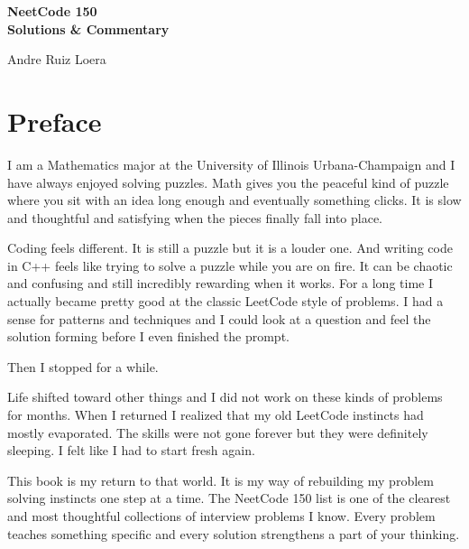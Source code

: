 \documentclass[12pt,letterpaper]{book}
\theoremstyle{definition}
\theoremstyle{remark}
\begin{document}
\begin{titlepage}
\begin{center}

\vspace*{4cm}

{\Huge\bfseries NeetCode 150}\\[1cm]

{\Large\bfseries Solutions \& Commentary}

\vfill

{\LARGE Andre Ruiz Loera}

\vspace{3cm}

\end{center}
\end{titlepage}

\chapter*{Preface}

I am a Mathematics major at the University of Illinois Urbana-Champaign and I have always enjoyed solving puzzles. Math gives you the peaceful kind of puzzle where you sit with an idea long enough and eventually something clicks. It is slow and thoughtful and satisfying when the pieces finally fall into place.

Coding feels different. It is still a puzzle but it is a louder one. And writing code in C++ feels like trying to solve a puzzle while you are on fire. It can be chaotic and confusing and still incredibly rewarding when it works. For a long time I actually became pretty good at the classic LeetCode style of problems. I had a sense for patterns and techniques and I could look at a question and feel the solution forming before I even finished the prompt.

Then I stopped for a while.

Life shifted toward other things and I did not work on these kinds of problems for months. When I returned I realized that my old LeetCode instincts had mostly evaporated. The skills were not gone forever but they were definitely sleeping. I felt like I had to start fresh again.

This book is my return to that world. It is my way of rebuilding my problem solving instincts one step at a time. The NeetCode 150 list is one of the clearest and most thoughtful collections of interview problems I know. Every problem teaches something specific and every solution strengthens a part of your thinking.
\end{document}
